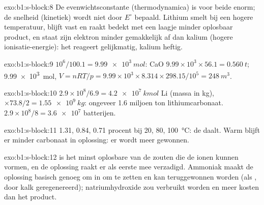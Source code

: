 \begin{solution}{exo:b1:s-block:8}
De evenwichtsconstante (thermodynamica) is voor beide enorm; de snelheid
(kinetiek) wordt niet door $E^\circ$ bepaald. Lithium smelt bij een hogere
temperatuur, blijft vast en raakt bedekt met een laagje minder oplosbaar
product, en staat zijn elektron minder gemakkelijk af dan kalium (hogere
ionisatie-energie): het reageert gelijkmatig, kalium heftig.
\end{solution}

\begin{solution}{exo:b1:s-block:9}
$10^6/100.1 = \qty{9.99e3}{mol}$: CaO $9.99 \times 10^3 \times 56.1 =
\qty{0.560}{t}$;  \qty{9.99e3}{mol}, $V = nRT/p = 9.99 \times 10^3
\times 8.314 \times 298.15/10^5 = \qty{248}{m^3}$.
\end{solution}

\begin{solution}{exo:b1:s-block:10}
$2.9 \times 10^8/6.9 = \qty{4.2e7}{kmol}$ Li (massa in kg), $\times 73.8/2 =
\qty{1.55e9}{kg}$: ongeveer 1.6 miljoen ton lithiumcarbonaat.
$2.9 \times 10^8/8 = \num{3.6e7}$ batterijen.
\end{solution}

\begin{solution}{exo:b1:s-block:11}
1.31, 0.84, 0.71 procent bij 20, 80, \qty{100}{\celsius}: de 
daalt. Warm blijft er minder carbonaat in oplossing: er wordt meer
gewonnen.
\end{solution}

\begin{solution}{exo:b1:s-block:12}
 is het minst oplosbare van de zouten die de ionen kunnen
vormen, en de oplossing raakt er als eerste mee verzadigd. Ammoniak maakt
de oplossing basisch genoeg om  in  om te zetten en kan
teruggewonnen worden (als , door kalk geregenereerd);
natriumhydroxide zou verbruikt worden en meer kosten dan het product.
\end{solution}

